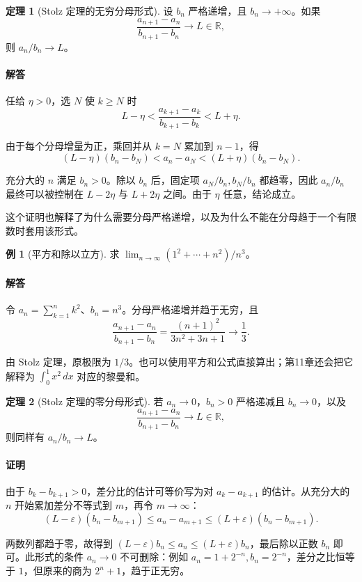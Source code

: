 \documentclass[UTF8,fontset=fandol,12pt,oneside,openany]{ctexrep}
\theoremstyle{definition}
\newtheorem{theorem}{定理}[chapter]
\newtheorem{example}{例}[chapter]
\begin{document}
\begin{theorem}[Stolz 定理的无穷分母形式]
设 $b_n$ 严格递增，且 $b_n\to+\infty$。如果
\[
\frac{a_{n+1}-a_n}{b_{n+1}-b_n}\to L\in\mathbb R,
\]
则 $a_n/b_n\to L$。
\end{theorem}

\paragraph{解答} 任给 $\eta>0$，选 $N$ 使 $k\ge N$ 时
\[
L-\eta<\frac{a_{k+1}-a_k}{b_{k+1}-b_k}<L+\eta.
\]

由于每个分母增量为正，乘回并从 $k=N$ 累加到 $n-1$，得
\[
(L-\eta)(b_n-b_N)<a_n-a_N<(L+\eta)(b_n-b_N).
\]

充分大的 $n$ 满足 $b_n>0$。除以 $b_n$ 后，固定项 $a_N/b_n,b_N/b_n$ 都趋零，因此 $a_n/b_n$ 最终可以被控制在 $L-2\eta$ 与 $L+2\eta$ 之间。由于 $\eta$ 任意，结论成立。

这个证明也解释了为什么需要分母严格递增，以及为什么不能在分母趋于一个有限数时套用该形式。

\begin{example}[平方和除以立方]
求 $\lim_{n\to\infty}(1^2+\cdots+n^2)/n^3$。
\end{example}

\paragraph{解答} 令 $a_n=\sum_{k=1}^nk^2$、$b_n=n^3$。分母严格递增并趋于无穷，且
\[
\frac{a_{n+1}-a_n}{b_{n+1}-b_n}
=\frac{(n+1)^2}{3n^2+3n+1}\to\frac13.
\]

由 Stolz 定理，原极限为 $1/3$。也可以使用平方和公式直接算出；第11章还会把它解释为 $\int_0^1x^2\,dx$ 对应的黎曼和。

\begin{theorem}[Stolz 定理的零分母形式]
若 $a_n\to0$，$b_n>0$ 严格递减且 $b_n\to0$，以及
\[
\frac{a_{n+1}-a_n}{b_{n+1}-b_n}\to L\in\mathbb R,
\]
则同样有 $a_n/b_n\to L$。
\end{theorem}

\paragraph{证明} 由于 $b_k-b_{k+1}>0$，差分比的估计可等价写为对 $a_k-a_{k+1}$ 的估计。从充分大的 $n$ 开始累加差分不等式到 $m$，再令 $m\to\infty$：
\[
(L-\varepsilon)(b_n-b_{m+1})\le a_n-a_{m+1}\le(L+\varepsilon)(b_n-b_{m+1}).
\]

两数列都趋于零，故得到 $(L-\varepsilon)b_n\le a_n\le(L+\varepsilon)b_n$，最后除以正数 $b_n$ 即可。此形式的条件 $a_n\to0$ 不可删除：例如 $a_n=1+2^{-n},b_n=2^{-n}$，差分之比恒等于 $1$，但原来的商为 $2^n+1$，趋于正无穷。
\end{document}
